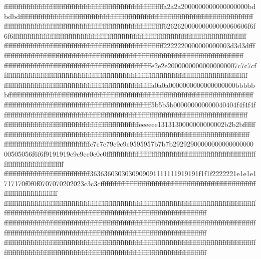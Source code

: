 {{{ffffffffffffffffffffffffffffffffffffffffffffffffffffffffffffffffffffffffffffffa2a2a2000000000000000000bdbdbdffffffffffffffffffffffffffffffffffffffffffffffffffffffffffffffffffffffffffffffffffffffffffffffffffffffffffffffffff
ffffffffffffffffffffffffffffffffffffffffffffffffffffffffffffffffffffffffffffff626262000000000000060606f6f6f6ffffffffffffffffffffffffffffffffffffffffffffffffffffffffffffffffffffffffffffffffffffffffffffffffffffffffffffffffff
ffffffffffffffffffffffffffffffffffffffffffffffffffffffffffffffffffffffffffffff2222220000000000003d3d3dffffffffffffffffffffffffffffffffffffffffffffffffffffffffffffffffffffffffffffffffffffffffffffffffffffffffffffffffffffffff
ffffffffffffffffffffffffffffffffffffffffffffffffffffffffffffffffffffffffe2e2e20000000000000000007c7c7cffffffffffffffffffffffffffffffffffffffffffffffffffffffffffffffffffffffffffffffffffffffffffffffffffffffffffffffffffffffff
ffffffffffffffffffffffffffffffffffffffffffffffffffffffffffffffffffffffffa0a0a0000000000000000000bbbbbbffffffffffffffffffffffffffffffffffffffffffffffffffffffffffffffffffffffffffffffffffffffffffffffffffffffffffffffffffffffff
ffffffffffffffffffffffffffffffffffffffffffffffffffffffffffffffffffffffff5b5b5b000000000000040404f4f4f4ffffffffffffffffffffffffffffffffffffffffffffffffffffffffffffffffffffffffffffffffffffffffffffffffffffffffffffffffffffffff
ffffffffffffffffffffffffffffffffffffffffffffffffffffffffffffffffffeeeeee1313130000000000002b2b2bffffffffffffffffffffffffffffffffffffffffffffffffffffffffffffffffffffffffffffffffffffffffffffffffffffffffffffffffffffffffffffff
ffffffffffffffffffffffffffffffffffffffffffc7c7c79c9c9c9595957b7b7b2929290000000000000000000505056f6f6f9191919c9c9cc0c0c0ffffffffffffffffffffffffffffffffffffffffffffffffffffffffffffffffffffffffffffffffffffffffffffffffffffff
ffffffffffffffffffffffffffffffffffffffffff3636360303030909091111111919191f1f1f2222221e1e1e1717170f0f0f0707070202023c3c3cffffffffffffffffffffffffffffffffffffffffffffffffffffffffffffffffffffffffffffffffffffffffffffffffffffff
ffffffffffffffffffffffffffffffffffffffffffffffffffffffffffffffffffffffffffffffffffffffffffffffffffffffffffffffffffffffffffffffffffffffffffffffffffffffffffffffffffffffffffffffffffffffffffffffffffffffffffffffffffffffffffffff
ffffffffffffffffffffffffffffffffffffffffffffffffffffffffffffffffffffffffffffffffffffffffffffffffffffffffffffffffffffffffffffffffffffffffffffffffffffffffffffffffffffffffffffffffffffffffffffffffffffffffffffffffffffffffffffff
ffffffffffffffffffffffffffffffffffffffffffffffffffffffffffffffffffffffffffffffffffffffffffffffffffffffffffffffffffffffffffffffffffffffffffffffffffffffffffffffffffffffffffffffffffffffffffffffffffffffffffffffffffffffffffffff
}}}
